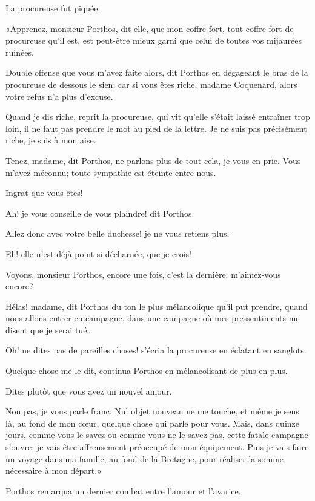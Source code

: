La procureuse fut piquée. 

«Apprenez, monsieur Porthos, dit-elle, que mon coffre-fort, tout coffre-fort de procureuse qu'il est, est peut-être mieux garni que celui de toutes vos mijaurées ruinées. 

\speak  Double offense que vous m'avez faite alors, dit Porthos en dégageant le bras de la procureuse de dessous le sien; car si vous êtes riche, madame Coquenard, alors votre refus n'a plus d'excuse. 

\speak  Quand je dis riche, reprit la procureuse, qui vit qu'elle s'était laissé entraîner trop loin, il ne faut pas prendre le mot au pied de la lettre. Je ne suis pas précisément riche, je suis à mon aise. 

\speak  Tenez, madame, dit Porthos, ne parlons plus de tout cela, je vous en prie. Vous m'avez méconnu; toute sympathie est éteinte entre nous. 

\speak  Ingrat que vous êtes! 

\speak  Ah! je vous conseille de vous plaindre! dit Porthos. 

\speak  Allez donc avec votre belle duchesse! je ne vous retiens plus. 

\speak  Eh! elle n'est déjà point si décharnée, que je crois! 

\speak  Voyons, monsieur Porthos, encore une fois, c'est la dernière: m'aimez-vous encore? 

\speak  Hélas! madame, dit Porthos du ton le plus mélancolique qu'il put prendre, quand nous allons entrer en campagne, dans une campagne où mes pressentiments me disent que je serai tué\dots 

\speak  Oh! ne dites pas de pareilles choses! s'écria la procureuse en éclatant en sanglots. 

\speak  Quelque chose me le dit, continua Porthos en mélancolisant de plus en plus. 

\speak  Dites plutôt que vous avez un nouvel amour. 

\speak  Non pas, je vous parle franc. Nul objet nouveau ne me touche, et même je sens là, au fond de mon cœur, quelque chose qui parle pour vous. Mais, dans quinze jours, comme vous le savez ou comme vous ne le savez pas, cette fatale campagne s'ouvre; je vais être affreusement préoccupé de mon équipement. Puis je vais faire un voyage dans ma famille, au fond de la Bretagne, pour réaliser la somme nécessaire à mon départ.» 

Porthos remarqua un dernier combat entre l'amour et l'avarice. 

